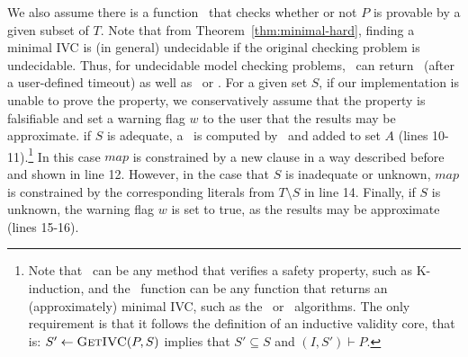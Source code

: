 We also assume there is a function \isadeq\ that checks whether or
not $P$ is provable by a given subset of $T$.  Note that from Theorem~\ref{thm:minimal-hard}, finding a minimal IVC is (in general) undecidable if the original checking problem is undecidable.  Thus, for undecidable model checking problems, \isadeq\  can return \unknown ~(after a user-defined timeout) as well as \adequate\ or \inadequate.
For a given set $S$, if our implementation is unable to prove the property, we conservatively assume that the property is falsifiable and set a warning flag $w$ to the user that the results may be approximate.  %
if $S$ is adequate, a \mivc
~is computed by \getivc ~and added to set $A$ (lines 10-11).\footnote{Note
  that \isadeq ~can be any method that verifies a safety property,
  such as K-induction, and the \getivc\ function can be any function
  that returns an (approximately) minimal IVC, such as the \ucalg\ or
  \ucbfalg\ algorithms. The only requirement is
  that it follows the definition of an inductive validity core, that
  is: $S' \leftarrow \textsc{GetIVC} (P, S)$ implies that $S' \subseteq S$ and
  $(I, S') \vdash P$.} In this case $map$ is constrained by a new
clause in a way described before and shown in line 12. However, in the
case that $S$ is inadequate or unknown, $map$ is constrained by the corresponding
literals from $T \setminus S$ in line 14.  Finally, if $S$ is unknown, the warning flag $w$ is set to true, as the results may be approximate (lines 15-16).

